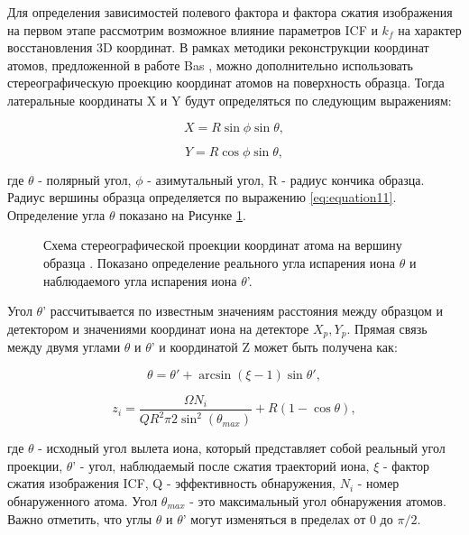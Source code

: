 Для определения зависимостей полевого фактора и фактора сжатия изображения на первом этапе рассмотрим возможное влияние параметров ICF и $k_f$ на  характер восстановления 3D координат. В рамках методики реконструкции координат атомов, предложенной в работе Bas \cite{Bas95}, можно дополнительно использовать стереографическую проекцию координат атомов на поверхность образца. Тогда латеральные координаты X и Y будут определяться по следующим выражениям:

\begin{equation}
	\label{eq:equation3_1}
	X = R \sin{\phi}\sin{\theta},	
\end{equation}

\begin{equation}
	\label{eq:equation3_2}
	Y = R \cos{\phi}\sin{\theta},	
\end{equation}

где $\theta$ - полярный угол, $\phi$ - азимутальный угол, R - радиус кончика образца. Радиус вершины образца определяется по выражению \cref{eq:equation11}.  Определение угла $\theta$ показано на Рисунке \cref{fig:p3_projection}.

\begin{figure}[htb]
	\caption{Схема стереографической проекции координат атома на вершину образца \cite{scbibDensity}. Показано определение реального угла испарения иона $\theta$ и наблюдаемого угла испарения иона $\theta$'.}
	\label{fig:p3_projection}
\end{figure} 

Угол $\theta$' рассчитывается по известным значениям расстояния между образцом и детектором и значениями координат иона на детекторе $X_p, Y_p$. Прямая связь между двумя углами $\theta$ и $\theta$' и координатой Z может быть получена как:

\begin{equation}
	\label{eq:equation3_4}
	\theta = \theta' + \arcsin(\xi - 1)\sin{\theta'},
\end{equation}

\begin{equation}
	\label{eq:equation3_5}
	z_i = \frac{\Omega N_i}{Q R^2 \pi 2 {\sin^2(\theta_{max})}} + R (1- \cos{\theta}),
\end{equation}

где $\theta$ - исходный угол вылета иона, который представляет собой реальный угол проекции, $\theta$' - угол, наблюдаемый после сжатия траекторий иона, $\xi$ - фактор сжатия изображения ICF, Q - эффективность обнаружения, $N_i$ - номер обнаруженного атома. Угол $\theta_{max}$ - это максимальный угол обнаружения атомов. Важно отметить, что углы $\theta$ и $\theta$' могут изменяться в пределах от 0 до $\pi/2$.

